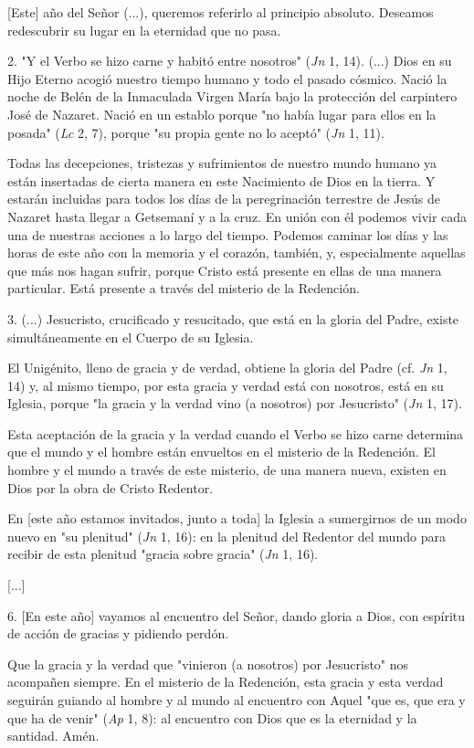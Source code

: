 {[}Este{]} año del Señor (...), queremos referirlo al principio
absoluto. Deseamos redescubrir su lugar en la eternidad que no pasa.

2. "Y el Verbo se hizo carne y habitó entre nosotros" (\emph{Jn} 1, 14).
(...) Dios en su Hijo Eterno acogió nuestro tiempo humano y todo el
pasado cósmico. Nació la noche de Belén de la Inmaculada Virgen María
bajo la protección del carpintero José de Nazaret. Nació en un establo
porque "no había lugar para ellos en la posada" (\emph{Lc} 2, 7), porque
"su propia gente no lo aceptó" (\emph{Jn} 1, 11).

Todas las decepciones, tristezas y sufrimientos de nuestro mundo humano
ya están insertadas de cierta manera en este Nacimiento de Dios en la
tierra. Y estarán incluidas para todos los días de la peregrinación
terrestre de Jesús de Nazaret hasta llegar a Getsemaní y a la cruz. En
unión con él podemos vivir cada una de nuestras acciones a lo largo del
tiempo. Podemos caminar los días y las horas de este año con la memoria
y el corazón, también, y, especialmente aquellas que más nos hagan
sufrir, porque Cristo está presente en ellas de una manera particular.
Está presente a través del misterio de la Redención.

3. (...) Jesucristo, crucificado y resucitado, que está en la gloria del
Padre, existe simultáneamente en el Cuerpo de su Iglesia.

El Unigénito, lleno de gracia y de verdad, obtiene la gloria del Padre
(cf. \emph{Jn} 1, 14) y, al mismo tiempo, por esta gracia y verdad está
con nosotros, está en su Iglesia, porque "la gracia y la verdad vino (a
nosotros) por Jesucristo" (\emph{Jn} 1, 17).

Esta aceptación de la gracia y la verdad cuando el Verbo se hizo carne
determina que el mundo y el hombre están envueltos en el misterio de la
Redención. El hombre y el mundo a través de este misterio, de una manera
nueva, existen en Dios por la obra de Cristo Redentor.

En {[}este año estamos invitados, junto a toda{]} la Iglesia a
sumergirnos de un modo nuevo en "su plenitud" (\emph{Jn} 1, 16): en la
plenitud del Redentor del mundo para recibir de esta plenitud "gracia
sobre gracia" (\emph{Jn} 1, 16).

{[}...{]}

6. {[}En este año{]} vayamos al encuentro del Señor, dando gloria a
Dios, con espíritu de acción de gracias y pidiendo perdón.

Que la gracia y la verdad que "vinieron (a nosotros) por Jesucristo" nos
acompañen siempre. En el misterio de la Redención, esta gracia y esta
verdad seguirán guiando al hombre y al mundo al encuentro con Aquel "que
es, que era y que ha de venir" (\emph{Ap} 1, 8): al encuentro con Dios
que es la eternidad y la santidad. Amén.


